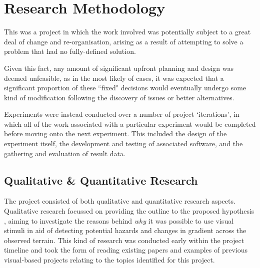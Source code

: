 %
%

\section{Research Methodology}

This was a project in which the work involved was potentially subject to a great deal of change and re-organisation, arising as a result of attempting to solve a problem that had no fully-defined solution. 

Given this fact, any amount of significant upfront planning and design was deemed unfeasible, as in the most likely of cases, it was expected that a significant proportion of these ``fixed" decisions would eventually undergo some kind of modification following the discovery of issues or better alternatives.

Experiments were instead conducted over a number of project `iterations', in which all of the work associated with a particular experiment would be completed before moving onto the next experiment. This included the design of the experiment itself, the development and testing of associated software, and the gathering and evaluation of result data. 

\subsection{Qualitative \& Quantitative Research}

The project consisted of both qualitative and quantitative research aspects. Qualitative research focussed on providing the outline to the proposed hypothesis \cite{research-types}, aiming to investigate the reasons behind \textit{why} it was possible to use visual stimuli in aid of detecting potential hazards and changes in gradient across the observed terrain. This kind of research was conducted early within the project timeline and took the form of reading existing papers and examples of previous visual-based projects relating to the topics identified for this project.

